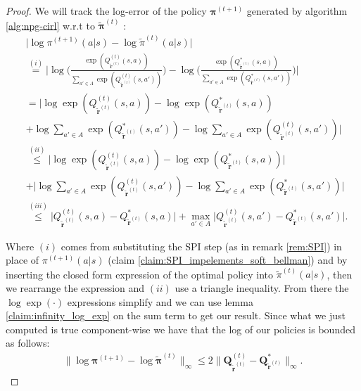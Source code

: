 \begin{proof}
    We will track the log-error of the policy $\bm{\pi}^{(t+1)}$ generated by algorithm \ref{alg:npg-cirl} w.r.t to $\tilde{\bm{\pi}}^{(t)}$ :
\begin{align*}
    &\big| \log {\pi}^{(t+1)}(a|s) - \log \tilde{{\pi}}^{(t)}(a|s) \big|\\
    &\stackrel{(i)}{=} 
    \Bigg| 
        \log \Bigg(\frac{
            \exp(Q^{(t)}_{\tilde{\bm{r}}^{(t)}} (s,a) )
        }{
            \sum_{a' \in A} 
            \exp(Q^{(t)}_{\tilde{\bm{r}}^{(t)}} (s,a') )
        } \Bigg) -
        \log \Bigg(\frac{
            \exp(Q^*_{\tilde{\bm{r}}^{(t)}} (s,a) )
        }{
            \sum_{a' \in A} 
            \exp(Q^*_{\tilde{\bm{r}}^{(t)}} (s,a') )
        } \Bigg)  
    \Bigg| \\
    &=
    \Bigg| 
        \log \exp(Q^{(t)}_{\tilde{\bm{r}}^{(t)}} (s,a) )
        -
        \log \exp(Q^*_{\tilde{\bm{r}}^{(t)}} (s,a) )\\ &
        + \log  \sum_{a' \in A} \exp(Q^*_{\tilde{\bm{r}}^{(t)}} (s,a') )
        - \log  \sum_{a' \in A} \exp(Q^{(t)}_{\tilde{\bm{r}}^{(t)}} (s,a') )
    \Bigg| \\
    &\stackrel{(ii)}{\leq} 
    \Bigg| 
    \log \exp(Q^{(t)}_{\tilde{\bm{r}}^{(t)}} (s,a) )
    - \log \exp(Q^*_{\tilde{\bm{r}}^{(t)}} (s,a) )
    \Bigg| \\ &
    +
    \Bigg| 
        \log  \sum_{a' \in A} \exp(Q^{(t)}_{\tilde{\bm{r}}^{(t)}} (s,a') )
        - \log  \sum_{a' \in A} \exp(Q^*_{\tilde{\bm{r}}^{(t)}} (s,a') )
    \Bigg| \\
    &\stackrel{(iii)}{\leq} 
    \Bigg| 
     Q^{(t)}_{\tilde{\bm{r}}^{(t)}} (s,a) 
    - Q^*_{\tilde{\bm{r}}^{(t)}} (s,a) 
    \Bigg| 
    + \max_{a'\in A}
    \Bigg| 
        Q^{(t)}_{\tilde{\bm{r}}^{(t)}} (s,a') -
        Q^*_{\tilde{\bm{r}}^{(t)}} (s,a') 
    \Bigg|.
\end{align*}

Where $(i)$ comes from substituting the SPI step (as in remark \ref{rem:SPI}) in place of ${\pi}^{(t+1)}(a|s)$ (claim  \ref{claim:SPI_impelements_soft_bellman}) and by inserting the closed form expression of the optimal policy into $\tilde{{\pi}}^{(t)}(a|s)$, then we rearrange the expression and $(ii)$ use a triangle inequality. From there the $\log \exp (\cdot)$ expressions simplify and we can use lemma \ref{claim:infinity_log_exp} on the sum term to get our result. Since what we just computed is true component-wise we have that the log of our policies is bounded as follows:
\begin{align*}
    \| \log \bm{\pi}^{(t+1)} - \log \tilde{\bm{\pi}}^{(t)} \|_\infty 
    \leq
    2 \|\bm{Q}^{(t)}_{\tilde{\bm{r}}^{(t)}}- \bm{Q}^*_{\tilde{\bm{r}}^{(t)}} \|_\infty.
\end{align*}


\end{proof}
